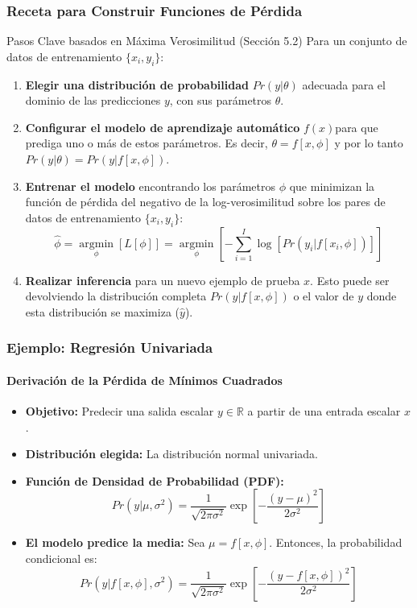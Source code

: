 \documentclass[aspectratio=169, 10pt]{beamer}
\begin{document}
\begin{frame}
	\frametitle{Receta para Construir Funciones de Pérdida}
	\begin{block}{Pasos Clave basados en Máxima Verosimilitud (Sección 5.2)}
		Para un conjunto de datos de entrenamiento \(\{x_i, y_i\}\):
		\begin{enumerate}
			\item \textbf{Elegir una distribución de probabilidad} \(Pr(y|\theta)\) adecuada para el dominio de las predicciones $y$, con sus parámetros \(\theta\).
			\item \textbf{Configurar el modelo de aprendizaje automático} $f(x)$para que prediga uno o más de estos parámetros. Es decir, \(\theta = f[x, \phi]\) y por lo tanto \(Pr(y|\theta) = Pr(y|f[x, \phi])\).
			\item \textbf{Entrenar el modelo} encontrando los parámetros \(\phi\) que minimizan la función de pérdida del negativo de la log-verosimilitud sobre los pares de datos de entrenamiento \(\{x_i, y_i\}\):
			\begin{equation*}
				\hat{\phi} = \underset{\phi}{\operatorname{argmin}} \left[ L[\phi] \right] = \underset{\phi}{\operatorname{argmin}} \left[ -\sum_{i=1}^{I} \log [Pr(y_i|f[x_i, \phi])] \right] \tag{5.6}
			\end{equation*}
			\item \textbf{Realizar inferencia} para un nuevo ejemplo de prueba $x$. Esto puede ser devolviendo la distribución completa \(Pr(y|f[x, \phi])\) o el valor de $y$ donde esta distribución se maximiza (\(\hat{y}\)).
		\end{enumerate}
	\end{block}
\end{frame}

\begin{frame}[shrink]
	\frametitle{Ejemplo: Regresión Univariada}
	\framesubtitle{Derivación de la Pérdida de Mínimos Cuadrados}
	\begin{itemize}
		\item \textbf{Objetivo:} Predecir una salida escalar \(y \in \mathbb{R}\) a partir de una entrada escalar $x$.
		\item \textbf{Distribución elegida:} La distribución normal univariada.
		\item \textbf{Función de Densidad de Probabilidad (PDF):}
		\begin{equation*}
			Pr(y|\mu, \sigma^2) = \frac{1}{\sqrt{2\pi\sigma^2}} \exp\left[-\frac{(y - \mu)^2}{2\sigma^2}\right] \tag{5.7}
		\end{equation*}
		\item \textbf{El modelo predice la media:} Sea \(\mu = f[x, \phi]\). Entonces, la probabilidad condicional es:
		\begin{equation*}
			Pr(y|f[x, \phi], \sigma^2) = \frac{1}{\sqrt{2\pi\sigma^2}} \exp\left[-\frac{(y - f[x, \phi])^2}{2\sigma^2}\right] \tag{5.8}
		\end{equation*}
	\end{itemize}
	\end{frame}
		
\end{document}
